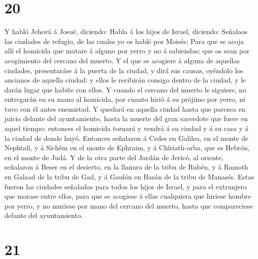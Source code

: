 \hypertarget{section-19}{%
\section{20}\label{section-19}}

 Y habló Jehová á Josué, diciendo:  Habla á
los hijos de Israel, diciendo: Señalaos las ciudades de refugio, de las
cuales yo os hablé por Moisés;  Para que se acoja allí el
homicida que matare á alguno por yerro y no á sabiendas; que os sean por
acogimiento del cercano del muerto.  Y el que se acogiere
á alguna de aquellas ciudades, presentaráse á la puerta de la ciudad, y
dirá sus causas, oyéndolo los ancianos de aquella ciudad: y ellos le
recibirán consigo dentro de la ciudad, y le darán lugar que habite con
ellos.  Y cuando el cercano del muerto le siguiere, no
entregarán en su mano al homicida, por cuanto hirió á su prójimo por
yerro, ni tuvo con él antes enemistad.  Y quedará en
aquella ciudad hasta que parezca en juicio delante del ayuntamiento,
hasta la muerte del gran sacerdote que fuere en aquel tiempo: entonces
el homicida tornará y vendrá á su ciudad y á su casa y á la ciudad de
donde huyó.  Entonces señalaron á Cedes en Galilea, en el
monte de Nephtalí, y á Sichêm en el monte de Ephraim, y á Chîriath-arba,
que es Hebrón, en el monte de Judá.  Y de la otra parte
del Jordán de Jericó, al oriente, señalaron á Beser en el desierto, en
la llanura de la tribu de Rubén, y á Ramoth en Galaad de la tribu de
Gad, y á Gaulón en Basán de la tribu de Manasés.  Estas
fueron las ciudades señaladas para todos los hijos de Israel, y para el
extranjero que morase entre ellos, para que se acogiese á ellas
cualquiera que hiriese hombre por yerro, y no muriese por mano del
cercano del muerto, hasta que compareciese delante del ayuntamiento.

\hypertarget{section-20}{%
\section{21}\label{section-20}}

